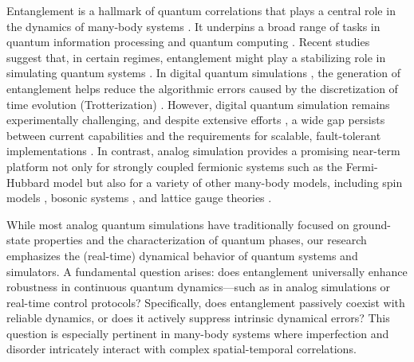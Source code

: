 \documentclass[12pt]{article}
\begin{document}
Entanglement is a hallmark of quantum correlations that plays a central role in the dynamics of many-body systems \cite{VVRevModPhys.80.517, EntanglementRevModPhys.81.865, JensRevModPhys.82.277, MBLRevModPhys.91.021001}. It underpins a broad range of tasks in quantum information processing and quantum computing \cite{bennett1993teleporting,jozsaRoleEntanglementQuantum2003,giovannetti2011advances}. Recent studies suggest that, in certain regimes,  entanglement might play a stabilizing role in simulating quantum systems \cite{Zhao_2025NP,feng2025trotterizationoperatorscramblingentanglement}. In digital quantum simulations \cite{lloydUniversalQuantumSimulators1996,childsTheoryTrotterError2021}, the generation of entanglement helps reduce the algorithmic errors caused by the discretization of time evolution (Trotterization) \cite{Zhao_2025NP}. 
However, digital quantum simulation remains experimentally challenging, and despite extensive efforts \cite{lloydUniversalQuantumSimulators1996,childsTheoryTrotterError2021,lowHamiltonianSimulationQubitization2019,berrySimulatingHamiltonianDynamics2015}, a wide gap persists between current capabilities and the requirements for scalable, fault-tolerant implementations \cite{childsFirstQuantumSimulation2018}. In contrast, analog simulation provides a promising near-term platform not only for strongly coupled fermionic systems such as the Fermi-Hubbard model \cite{arovas2022hubbard,esslinger2010fermi,hart2015observation, shao2024antiferromagnetic} but also for a variety of other many-body models, including spin models \cite{bernien2017probing,simon2011quantum}, bosonic systems \cite{gross2017quantum,yang2020observation}, and lattice gauge theories 
\cite{ wiese2013ultracold,jordan2012quantum,zhou2022thermalization}. 

While most analog quantum simulations have traditionally focused on ground-state properties and the characterization of quantum phases, our research emphasizes the (real-time) dynamical behavior of quantum systems and simulators. A fundamental question arises: does entanglement universally enhance robustness in continuous quantum dynamics---such as in analog simulations or real-time control protocols?
Specifically, does entanglement passively coexist with reliable dynamics, or does it actively suppress intrinsic dynamical errors? This question is especially pertinent in many-body systems where imperfection and disorder intricately interact with complex spatial-temporal correlations.
\end{document}
